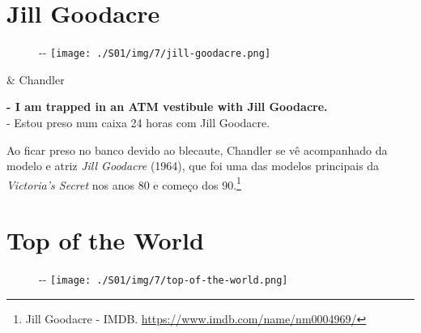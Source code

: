 \hypertarget{jill-goodacre}{%
\section{Jill Goodacre}\label{jill-goodacre}}

\begin{figure}[!ht]
  \begin{adjustwidth}{-\oddsidemargin-1in}{-\rightmargin}
    \centering
    \texttt{[image: ./S01/img/7/jill-goodacre.png]}
  \end{adjustwidth}
\end{figure}

\begin{tcolorbox}[enhanced,center upper,
    drop fuzzy shadow southeast, boxrule=0.3pt,
    lower separated=false, breakable,
    colframe=black!30!dialogoBorder,colback=white]
\begin{minipage}[c]{0.16\linewidth}
   & \centering \scriptsize{Chandler}
\end{minipage}
\hfill
\begin{minipage}[c]{0.8\linewidth}
  \textbf{- I am trapped in an ATM vestibule with Jill Goodacre.}\\
  - Estou preso num caixa 24 horas com Jill Goodacre.
\end{minipage}
\end{tcolorbox}

Ao ficar preso no banco devido ao blecaute, Chandler se vê acompanhado
da modelo e atriz \emph{Jill Goodacre} (1964), que foi uma das modelos
principais da \emph{Victoria's Secret} nos anos 80 e começo dos
90.\footnote{\sloppy Jill Goodacre - IMDB. \url{https://www.imdb.com/name/nm0004969/}}

\hypertarget{top-of-the-world}{%
\section{Top of the World}\label{top-of-the-world}}

\begin{figure}[!ht]
  \begin{adjustwidth}{-\oddsidemargin-1in}{-\rightmargin}
    \centering
    \texttt{[image: ./S01/img/7/top-of-the-world.png]}
  \end{adjustwidth}
\end{figure}

